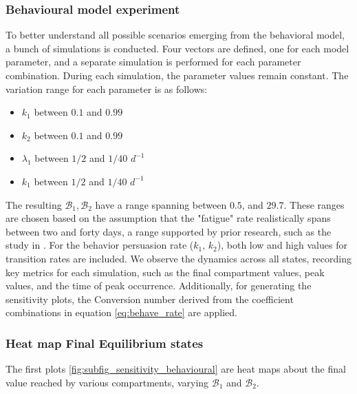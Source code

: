 \subsubsection{Behavioural model experiment}
To better understand all possible scenarios emerging from the behavioral model, a bunch of simulations is conducted. Four vectors are defined, one for each model parameter, and a separate simulation is performed for each parameter combination. During each simulation, the parameter values remain constant. The variation range for each parameter is as follows:
\begin{itemize}
	\item $k_1$ between $0.1$ and $0.99$
	\item $k_2$ between $0.1$ and $0.99$
	\item $\lambda_1$ between $1/2$ and $1/40$ $d^{-1}$
	\item $k_1$ between $1/2$ and $1/40$ $d^{-1}$
\end{itemize}
The resulting $\mathcal{B}_1, \mathcal{B}_2$ have a range spanning between $0.5$, and $29.7$.
These ranges are chosen based on the assumption that the "fatigue" rate realistically spans between two and forty days, a range supported by prior research, such as the study in \cite{Kwasnicka_2016}. For the behavior persuasion rate ($k_1$, $k_2$), both low and high values for transition rates are included. We observe the dynamics across all states, recording key metrics for each simulation, such as the final compartment values, peak values, and the time of peak occurrence. Additionally, for generating the sensitivity plots, the Conversion number derived from the coefficient combinations in equation \eqref{eq:behave_rate} are applied. 
\subsubsection{Heat map Final Equilibrium states}
The first plots \ref{fig:subfig_sensitivity_behavioural} are heat maps about the final value reached by various compartments, varying $\mathcal{B}_1$ and $\mathcal{B}_2$.

